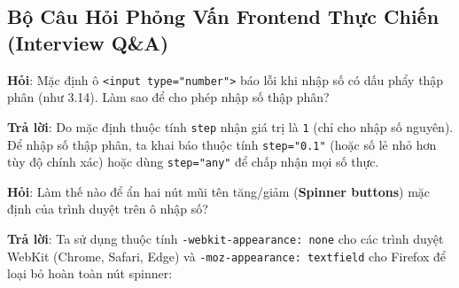 \documentclass[11pt,oneside]{book}
\newcommand{\thd}[1]{\textcolor{white}{\textbf{\strut #1}}}
\newcommand{\codeinline}[1]{\textcolor{accentOrange}{\texttt{#1}}}
\newcommand{\term}[1]{\textbf{\textcolor{primaryBlue}{#1}}}
\begin{document}
\begin{prettyTableBox}
\end{prettyTableBox}

\subsection{Bộ Câu Hỏi Phỏng Vấn Frontend Thực Chiến (Interview Q\&A)}

\begin{noteBox}[Câu Hỏi Phỏng Vấn 1: Nhập Số Thập Phân Trong input type="number"]
\textbf{Hỏi}: Mặc định ô \codeinline{<input type="number">} báo lỗi khi nhập số có dấu phẩy thập phân (như 3.14). Làm sao để cho phép nhập số thập phân?
\par\vspace{3pt}
\textbf{Trả lời}: Do mặc định thuộc tính \codeinline{step} nhận giá trị là \codeinline{1} (chỉ cho nhập số nguyên). Để nhập số thập phân, ta khai báo thuộc tính \codeinline{step="0.1"} (hoặc số lẻ nhỏ hơn tùy độ chính xác) hoặc dùng \codeinline{step="any"} để chấp nhận mọi số thực.
\end{noteBox}

\begin{noteBox}
\textbf{Hỏi}: Làm thế nào để ẩn hai nút mũi tên tăng/giảm (\term{Spinner buttons}) mặc định của trình duyệt trên ô nhập số?
\par\vspace{3pt}
\textbf{Trả lời}: Ta sử dụng thuộc tính \codeinline{-webkit-appearance: none} cho các trình duyệt WebKit (Chrome, Safari, Edge) và \codeinline{-moz-appearance: textfield} cho Firefox để loại bỏ hoàn toàn nút spinner:
\end{noteBox}
\end{document}
